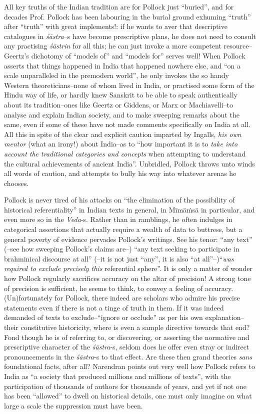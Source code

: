 All key truths of the Indian tradition are for Pollock just “buried”, and for decades Prof. Pollock has been labouring in the burial ground exhuming “truth” after “truth” with great implements!: if he wants to aver that descriptive catalogues in \textit{śāstra}–s have become prescriptive plans, he does not need to consult any practising \textit{śāstrin} for all this; he can just invoke a more competent resource–Geertz’s dichotomy of “models of” and “models for” serves well! When Pollock asserts that things happened in India that happened nowhere else, and “on a scale unparalleled in the premodern world”, he only invokes the so handy Western theoreticians–none of whom lived in India, or practised some form of the Hindu way of life, or hardly knew Sanskrit to be able to speak authentically about its tradition–ones like Geertz or Giddens, or Marx or Machiavelli–to analyse and explain Indian society, and to make sweeping remarks about the same, even if some of these have not made comments specifically on India at all. All this in spite of the clear and explicit caution imparted by Ingalls, \textit{his own mentor} (what an irony!) about India–as to “how important it is to \textit{take into account the traditional categories and concepts} when attempting to understand the cultural achievements of ancient India”. Unbridled, Pollock throws unto winds all words of caution, and attempts to bully his way into whatever arenas he chooses.

Pollock is never tired of his attacks on “the elimination of the possibility of historical referentiality” in Indian texts in general, in Mīmāṁsā in particular, and even more so in the \textit{Veda}-s. Rather than in ramblings, he often indulges in categorical assertions that actually require a wealth of data to buttress, but a general poverty of evidence pervades Pollock’s writings. See his tenor: “any text” (–see how sweeping Pollock’s claims are–) “any text seeking to participate in brahminical discourse at all” (–it is not just “any”, it is also “at all”–)\break “\textit{was required to exclude precisely this} referential sphere”. It is only a matter of wonder how Pollock regularly sacrifices accuracy on the altar of precision! A strong tone of precision is sufficient, he seems to think, to convey a feeling of accuracy. (Un)fortunately for Pollock, there indeed are scholars who admire his precise statements even if there is not a tinge of truth in them. If it was indeed demanded of texts to exclude–“ignore or occlude” as per his own explanation–their constitutive historicity, where is even a sample directive towards that end? Fond though he is of referring to, or discovering, or asserting the normative and prescriptive character of the \textit{śāstra}-s, seldom does he offer even stray or indirect pronouncements in the \textit{śāstra}-s to that effect. Are these then grand theories \textit{sans} foundational facts, after all? Narendran points out very well how Pollock refers to India as “a society that produced millions and millions of texts”, with the participation of thousands of authors for thousands of years, and yet if not one has been “allowed” to dwell on historical details, one must only imagine on what large a scale the suppression must have been.

